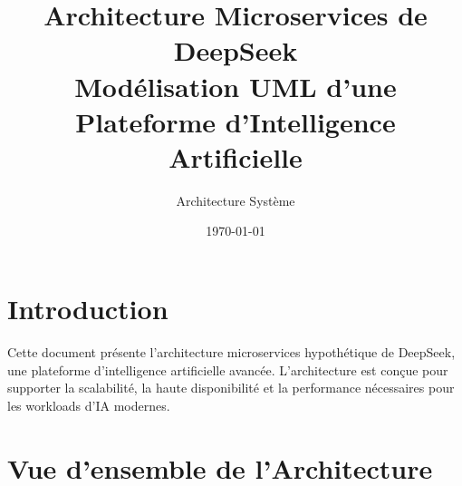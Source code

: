 \documentclass[12pt,a4paper]{article}
\title{\textbf{Architecture Microservices de DeepSeek} \\ 
       \large Modélisation UML d'une Plateforme d'Intelligence Artificielle}
\author{Architecture Système}
\date{\today}
\begin{document}
\maketitle
\tableofcontents
\newpage

\section{Introduction}

Cette document présente l'architecture microservices hypothétique de DeepSeek, une plateforme d'intelligence artificielle avancée. L'architecture est conçue pour supporter la scalabilité, la haute disponibilité et la performance nécessaires pour les workloads d'IA modernes.

\section{Vue d'ensemble de l'Architecture}
\end{document}
